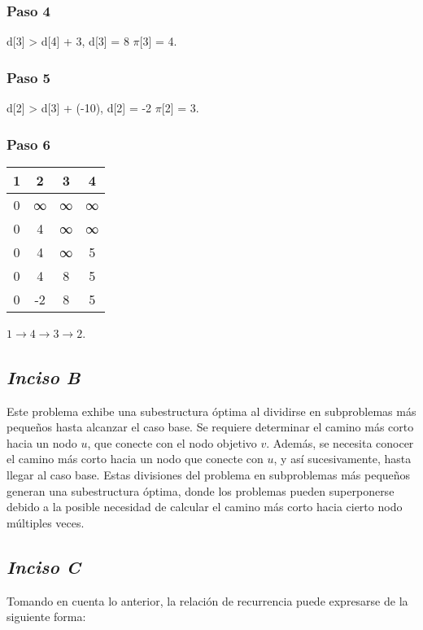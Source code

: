\subsubsection*{\textbf{Paso 4}}
 d[3] > d[4] + 3,  d[3] = 8  $\pi$[3] = 4.

\subsubsection*{\textbf{Paso 5}}
 d[2] > d[3] + (-10),  d[2] = -2  $\pi$[2] = 3.

\subsubsection*{\textbf{Paso 6}}
\begin{center}
\begin{tabular}{@{}cccc@{}}
\toprule
1 & 2  & 3 & 4 \\ \midrule
0 & ∞  & ∞ & ∞ \\ 
0 & 4  & ∞ & ∞ \\ 
0 & 4  & ∞ & 5 \\ 
0 & 4  & 8 & 5 \\ 
0 & -2 & 8 & 5 \\ \bottomrule
\end{tabular}
\end{center}
\hfill \break

 $1 \rightarrow 4 \rightarrow 3 \rightarrow 2$.


\subsection*{\textit{\textbf{Inciso B}}}
Este problema exhibe una subestructura óptima al dividirse en subproblemas más pequeños hasta alcanzar el caso base. Se requiere determinar el camino más corto hacia un nodo \(u\), que conecte con el nodo objetivo \(v\). Además, se necesita conocer el camino más corto hacia un nodo que conecte con \(u\), y así sucesivamente, hasta llegar al caso base. Estas divisiones del problema en subproblemas más pequeños generan una subestructura óptima, donde los problemas pueden superponerse debido a la posible necesidad de calcular el camino más corto hacia cierto nodo múltiples veces.

\subsection*{\textit{\textbf{Inciso C}}}
Tomando en cuenta lo anterior, la relación de recurrencia puede expresarse de la siguiente forma:

